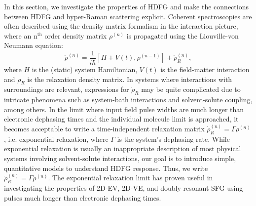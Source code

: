 \documentclass[aip, jcp, reprint, onecolumn, nofootinbib]{revtex4-2}
\begin{document}
In this section, we investigate the properties of HDFG and make the connections between HDFG and hyper-Raman scattering explicit.
Coherent spectroscopies are often described using the density matrix formalism in the interaction picture, where an n$^{\text{th}}$ order density matrix $\rho^{(n)}$ is propagated using the Liouville-von Neumann equation:
\begin{equation}\label{LVNE}
	\dot{\rho}^{(n)} = \frac{1}{i \hbar} [H + V(t), \rho^{(n-1)}] + \dot{\rho}^{(n)}_R,
\end{equation}
where $H$ is the (static) system Hamiltonian, $V(t)$ is the field-matter interaction and $\rho_R$ is the relaxation density matrix. \cite{RN455}
In systems where interactions with surroundings are relevant, expressions for $\dot{\rho}_R$ may be quite complicated due to intricate phenomena such as system-bath interactions and solvent-solute coupling, among others. \cite{Sung2001}
In the limit where input field pulse widths are much longer than electronic dephasing times and the individual molecule limit is approached, it becomes acceptable to write a time-independent relaxation matrix $\dot{\rho}^{(n)}_R= \Gamma \rho^{(n)}$, i.e. exponential relaxation, where $\Gamma$ is the system's dephasing rate. \cite{RN455, Sue1986, Sung2001}
While exponential relaxation is usually an inappropriate description of most physical systems involving solvent-solute interactions,\cite{Sue1986, Yan1988, Li1994, Myers1997} our goal is to introduce simple, quantitative models to understand HDFG response.
Thus, we write $\dot{\rho}^{(n)}_R= \Gamma \rho^{(n)}$.
The exponential relaxation limit has proven useful in investigating the properties of 2D-EV, 2D-VE, and doubly resonant SFG using pulses much longer than electronic dephasing times. \cite{Raschke2002, Gaynor2017}
\end{document}
